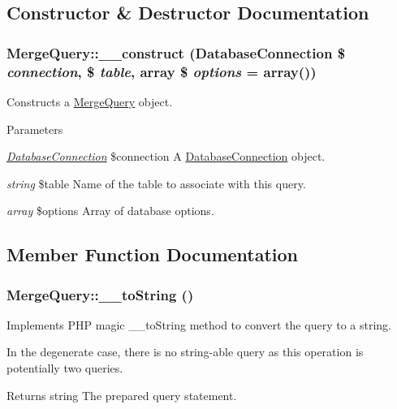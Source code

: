 \subsection{Constructor \& Destructor Documentation}
\hypertarget{classMergeQuery_a05ba5cf13796317567a0344cf58a028c}{
\subsubsection[{\_\-\_\-construct}]{\setlength{\rightskip}{0pt plus 5cm}MergeQuery::\_\-\_\-construct ({\bf DatabaseConnection} \$ {\em connection}, \/  \$ {\em table}, \/  array \$ {\em options} = {\ttfamily array()})}}
\label{classMergeQuery_a05ba5cf13796317567a0344cf58a028c}
Constructs a \hyperlink{classMergeQuery}{MergeQuery} object.


\begin{DoxyParams}{Parameters}
\item[{\em \hyperlink{classDatabaseConnection}{DatabaseConnection}}]\$connection A \hyperlink{classDatabaseConnection}{DatabaseConnection} object. \item[{\em string}]\$table Name of the table to associate with this query. \item[{\em array}]\$options Array of database options. \end{DoxyParams}


\subsection{Member Function Documentation}
\hypertarget{classMergeQuery_a66c98a8761c91bb633c4ea09ce0c467c}{
\subsubsection[{\_\-\_\-toString}]{\setlength{\rightskip}{0pt plus 5cm}MergeQuery::\_\-\_\-toString ()}}
\label{classMergeQuery_a66c98a8761c91bb633c4ea09ce0c467c}
Implements PHP magic \_\-\_\-toString method to convert the query to a string.

In the degenerate case, there is no string-\/able query as this operation is potentially two queries.

\begin{DoxyReturn}{Returns}
string The prepared query statement. 
\end{DoxyReturn}


